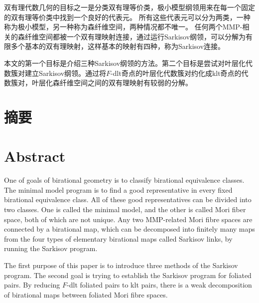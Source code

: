 

\maketitle%
\MAKETITLE%
\makedeclaration%
双有理代数几何的目标之一是分类双有理等价类，极小模型纲领用来在每一个固定的双有理等价类中找到一个良好的代表元。
所有这些代表元可以分为两类，一种称为极小模型，另一种称为森纤维空间，两种情况都不唯一。
任何两个MMP-相关的森纤维空间都被一个双有理映射连接，通过运行Sarkisov纲领，可以分解为有限多个基本的双有理映射，这样基本的映射有四种，称为Sarkisov连接。

本文的第一个目标是介绍三种Sarkisov纲领的方法。第二个目标是尝试对叶层化代数簇对建立Sarkisov纲领。通过将$F$-dlt奇点的叶层化代数簇对约化成klt奇点的代数簇对，叶层化森纤维空间之间的双有理映射有较弱的分解。 

\intobmk\chapter*{摘\quad 要}%
\setcounter{page}{1}%



\intobmk\chapter*{Abstract}%

One of goals of birational geometry is to classify birational equivalence classes. The minimal model program  is to find a good representative in every fixed birational equivalence class. 
All of these good representatives can be divided into two classes. One is called the minimal model, and the other is called Mori fiber space, both of  which are not unique. 
Any two MMP-related Mori fibre spaces are connected by a birational map, which can be decomposed into finitely many maps from the four types of elementary birational maps called Sarkisov links, by running the Sarkisov program. 

The first purpose of this paper is to introduce three methods of the Sarkisov program.
The second goal is trying to establish the Sarkisov program for foliated pairs. By reducing $F$-dlt foliated pairs to klt pairs, there is a weak decomposition of birational maps between foliated Mori fibre spaces.  

\cleardoublepage\pagestyle{frontmatterstyle}%

